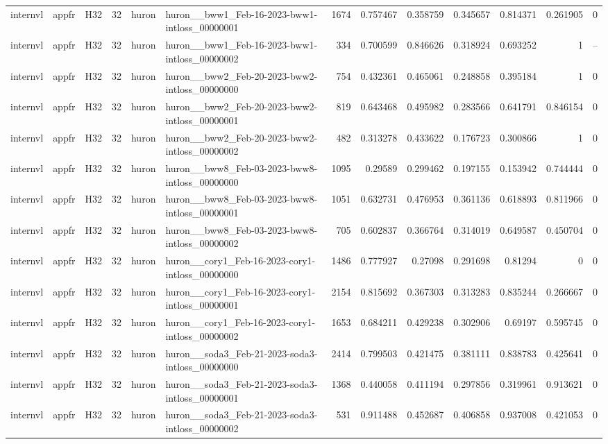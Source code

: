 \begin{longtable}{lllrllrrrrrrr}
internvl & appfr & H32 & 32 & huron & huron\_\_bww1\_Feb-16-2023-bww1-intloss\_00000001 & 1674 & 0.757467 & 0.358759 & 0.345657 & 0.814371 & 0.261905 & 0 \\
internvl & appfr & H32 & 32 & huron & huron\_\_bww1\_Feb-16-2023-bww1-intloss\_00000002 & 334 & 0.700599 & 0.846626 & 0.318924 & 0.693252 & 1 & -- \\
internvl & appfr & H32 & 32 & huron & huron\_\_bww2\_Feb-20-2023-bww2-intloss\_00000000 & 754 & 0.432361 & 0.465061 & 0.248858 & 0.395184 & 1 & 0 \\
internvl & appfr & H32 & 32 & huron & huron\_\_bww2\_Feb-20-2023-bww2-intloss\_00000001 & 819 & 0.643468 & 0.495982 & 0.283566 & 0.641791 & 0.846154 & 0 \\
internvl & appfr & H32 & 32 & huron & huron\_\_bww2\_Feb-20-2023-bww2-intloss\_00000002 & 482 & 0.313278 & 0.433622 & 0.176723 & 0.300866 & 1 & 0 \\
internvl & appfr & H32 & 32 & huron & huron\_\_bww8\_Feb-03-2023-bww8-intloss\_00000000 & 1095 & 0.29589 & 0.299462 & 0.197155 & 0.153942 & 0.744444 & 0 \\
internvl & appfr & H32 & 32 & huron & huron\_\_bww8\_Feb-03-2023-bww8-intloss\_00000001 & 1051 & 0.632731 & 0.476953 & 0.361136 & 0.618893 & 0.811966 & 0 \\
internvl & appfr & H32 & 32 & huron & huron\_\_bww8\_Feb-03-2023-bww8-intloss\_00000002 & 705 & 0.602837 & 0.366764 & 0.314019 & 0.649587 & 0.450704 & 0 \\
internvl & appfr & H32 & 32 & huron & huron\_\_cory1\_Feb-16-2023-cory1-intloss\_00000000 & 1486 & 0.777927 & 0.27098 & 0.291698 & 0.81294 & 0 & 0 \\
internvl & appfr & H32 & 32 & huron & huron\_\_cory1\_Feb-16-2023-cory1-intloss\_00000001 & 2154 & 0.815692 & 0.367303 & 0.313283 & 0.835244 & 0.266667 & 0 \\
internvl & appfr & H32 & 32 & huron & huron\_\_cory1\_Feb-16-2023-cory1-intloss\_00000002 & 1653 & 0.684211 & 0.429238 & 0.302906 & 0.69197 & 0.595745 & 0 \\
internvl & appfr & H32 & 32 & huron & huron\_\_soda3\_Feb-21-2023-soda3-intloss\_00000000 & 2414 & 0.799503 & 0.421475 & 0.381111 & 0.838783 & 0.425641 & 0 \\
internvl & appfr & H32 & 32 & huron & huron\_\_soda3\_Feb-21-2023-soda3-intloss\_00000001 & 1368 & 0.440058 & 0.411194 & 0.297856 & 0.319961 & 0.913621 & 0 \\
internvl & appfr & H32 & 32 & huron & huron\_\_soda3\_Feb-21-2023-soda3-intloss\_00000002 & 531 & 0.911488 & 0.452687 & 0.406858 & 0.937008 & 0.421053 & 0 \\

\end{longtable}

